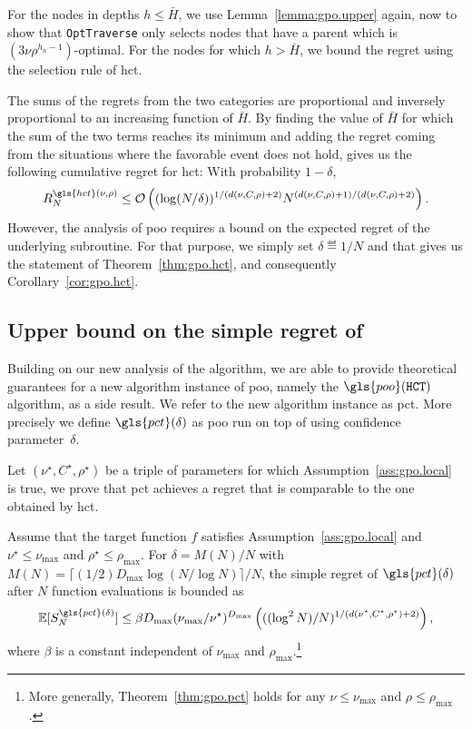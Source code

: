 For the nodes in depths $h \leq \bar H$, we  use
Lemma~\ref{lemma:gpo.upper} again, now to show that \texttt{OptTraverse} only selects nodes
that have a parent which is $(3\nu\rho^{h_n-1})$-optimal.
For the nodes for which  $h > \bar H$, we bound the regret using the
selection rule of \gls{hct}.

The sums of the regrets from the two categories are proportional
and inversely proportional to an increasing function of $\bar H$.
By finding the value of $\bar H$ for which the sum of the two
terms reaches its minimum and adding the regret coming
from the situations where the favorable event does not hold,
gives us the following cumulative regret for \gls{hct}: With probability $1-\delta$,
\[
	R_N^{\gls{hct}(\nu,\rho)} \leq \cO\left( (\log(N/\delta))^{1/(d(\nu,C,\rho)+2)}N^{(d(\nu,C,\rho)+1)/(d(\nu,C,\rho)+2)} \right).
\]
However, the analysis of \gls{poo} requires a bound on the expected regret of the underlying subroutine. For that purpose, we simply set $\delta \eqdef 1/N$ and that gives us the statement of Theorem~\ref{thm:gpo.hct}, and consequently Corollary~\ref{cor:gpo.hct}.

\subsection{Upper bound on the simple regret of \PCT{}}

Building on our new analysis of the \HCT{} algorithm, we are able to provide theoretical guarantees for a new algorithm instance of \gls{poo}, namely the $\gls{poo}(\HCT)$ algorithm, as a side result. We refer to the new algorithm instance as \gls{pct}. More precisely we define $\gls{pct}(\delta)$ as \gls{poo} run on top of \HCT using confidence parameter~$\delta$.

Let $(\nu^\star,C^\star,\rho^\star)$ be a triple of parameters for which Assumption~\ref{ass:gpo.local} is true, we prove that \gls{pct} achieves a regret that is comparable to the one obtained by \gls{hct}.


\begin{theorem}\label{thm:gpo.pct}
\begin{leftbar}[theorembar]
Assume that the target function $f$ satisfies Assumption~\ref{ass:gpo.local} and $\nu^\star \leq \nu_{\max}$ and $\rho^\star \leq \rho_{\max}$. For $\delta = M(N)/N$ with $M(N) = \lceil (1/2)D_{\max}\log(N/\log N)\rceil/N$, the simple regret of $\gls{pct}(\delta)$ after $N$ function evaluations is bounded as
\[
	\mathbb{E}[S_N^{\gls{pct}(\delta)}]  \leq \beta D_{\max}(\nu_{\max}/\nu^\star)^{D_{\max}} \left( ((\log^2 N)/N)^{1/(d(\nu^{\star},C^\star,\rho^{\star})+2)} \right),
\]
where $\beta$ is a constant independent of $\nu_{\max}$ and $\rho_{\max}$.\footnote{More generally, Theorem~\ref{thm:gpo.pct} holds for any $\nu \leq \nu_{\max}$ and $\rho \leq \rho_{\max}$.}
\end{leftbar}
\end{theorem}

